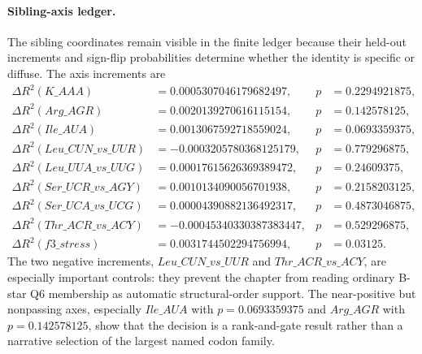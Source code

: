 \paragraph{Sibling-axis ledger.}
The sibling coordinates remain visible in the finite ledger because their held-out increments and sign-flip probabilities determine whether the identity is specific or diffuse.  The axis increments are
$$
\begin{aligned}
\Delta R^2(K\_AAA) &= 0.0005307046179682497, & p &= 0.2294921875,\\
\Delta R^2(Arg\_AGR) &= 0.0020139270616115154, & p &= 0.142578125,\\
\Delta R^2(Ile\_AUA) &= 0.0013067592718559024, & p &= 0.0693359375,\\
\Delta R^2(Leu\_CUN\_vs\_UUR) &= -0.0003205780368125179, & p &= 0.779296875,\\
\Delta R^2(Leu\_UUA\_vs\_UUG) &= 0.00017615626369389472, & p &= 0.24609375,\\
\Delta R^2(Ser\_UCR\_vs\_AGY) &= 0.0010134090056701938, & p &= 0.2158203125,\\
\Delta R^2(Ser\_UCA\_vs\_UCG) &= 0.00004390882136492317, & p &= 0.4873046875,\\
\Delta R^2(Thr\_ACR\_vs\_ACY) &= -0.00045340330387383447, & p &= 0.529296875,\\
\Delta R^2(f3\_stress) &= 0.0031744502294756994, & p &= 0.03125.
\end{aligned}
$$
The two negative increments, $Leu\_CUN\_vs\_UUR$ and $Thr\_ACR\_vs\_ACY$, are especially important controls: they prevent the chapter from reading ordinary B-star Q6 membership as automatic structural-order support.  The near-positive but nonpassing axes, especially $Ile\_AUA$ with $p=0.0693359375$ and $Arg\_AGR$ with $p=0.142578125$, show that the decision is a rank-and-gate result rather than a narrative selection of the largest named codon family.

